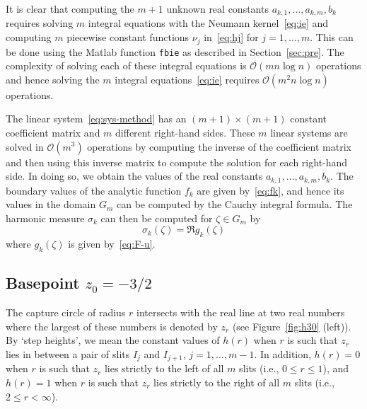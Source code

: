 It is clear that computing the $m+1$ unknown real constants $a_{k,1},\ldots,a_{k,m},b_k$ requires solving $m$ integral equations with the Neumann kernel~\eqref{eq:ie} and computing $m$ piecewise constant functions $\nu_j$ in~\eqref{eq:hj} for $j=1,\ldots,m$. 
This can be done using the {\sc Matlab} function \verb|fbie| as described in Section~\ref{sec:pre}. 
The complexity of solving each of these integral equations is $\mathcal{O}(mn\log n)$ operations and hence solving the $m$ integral equations~\eqref{eq:ie} requires $\mathcal{O}(m^2n\log n)$ operations.



The linear system~\eqref{eq:sys-method} has an $(m+1)\times(m+1)$ constant coefficient matrix and $m$ different right-hand sides. 
These $m$ linear systems are solved in $\mathcal{O}(m^3)$ operations by computing the inverse of the coefficient matrix and then using this inverse matrix to compute the solution for each right-hand side. In doing so, we obtain the values of the real constants $a_{k,1},\ldots,a_{k,m},b_k$. The boundary values of the analytic function $f_k$ are given by~\eqref{eq:fk}, and hence its values in the domain $G_m$ can be computed by the Cauchy integral formula. The harmonic measure $\sigma_k$ can then be computed for $\zeta\in G_m$ by
\begin{equation}\label{eq:sgj-gj}
\sigma_k(\zeta)=\Re g_k(\zeta)
\end{equation}
where $g_k(\zeta)$ is given by~\eqref{eq:F-u}. 




\subsection{Basepoint $z_0=-3/2$}

The capture circle of radius $r$ intersects with the real line at two real numbers where the largest of these numbers is denoted by $z_r$ (see Figure~\ref{fig:h30} (left)).
By `step heights', we mean the constant values of $h(r)$ when $r$ is such that $z_r$ lies in between a pair of slits $I_{j}$ and $I_{j+1}$, $j=1,\ldots,m-1$. In addition, $h(r) = 0$ when $r$ is such that $z_r$ lies strictly to the left of all $m$ slits (i.e., $0\le r\le1$), and $h(r) = 1$ when $r$ is such that $z_r$ lies strictly to the right of all $m$ slits (i.e., $2\le r<\infty$). 

